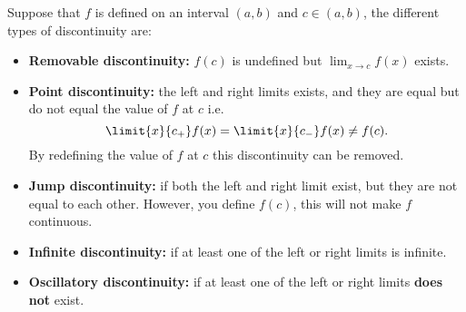 \documentclass[12pt, a4paper]{article}
\begin{document}
\begin{definition}
    Suppose that \(f\) is defined on an interval \((a,b)\) and \(c \in (a,b)\), the different types of discontinuity are:
    \begin{itemize}
        \item \textbf{Removable discontinuity:} \(f(c)\) is undefined but \(\lim_{x\to c} f(x)\) exists.
        \item \textbf{Point discontinuity:} the left and right limits exists, and they are equal but do not equal the value of \(f\) at \(c\) i.e. \[\limit{x}{c_+} f(x) =\limit{x}{c_-} f(x) \neq f(c).\]
        By redefining the value of \(f\) at \(c\) this discontinuity can be removed.
        \item \textbf{Jump discontinuity:} if both the left and right limit exist, but they are not equal to each other. However, you define \(f(c)\), this will not make \(f\) continuous.
        \item \textbf{Infinite discontinuity:} if at least one of the left or right limits is infinite.
        \item \textbf{Oscillatory discontinuity:} if at least one of the left or right limits \textbf{does not} exist.
    \end{itemize}
\end{definition}
\end{document}
